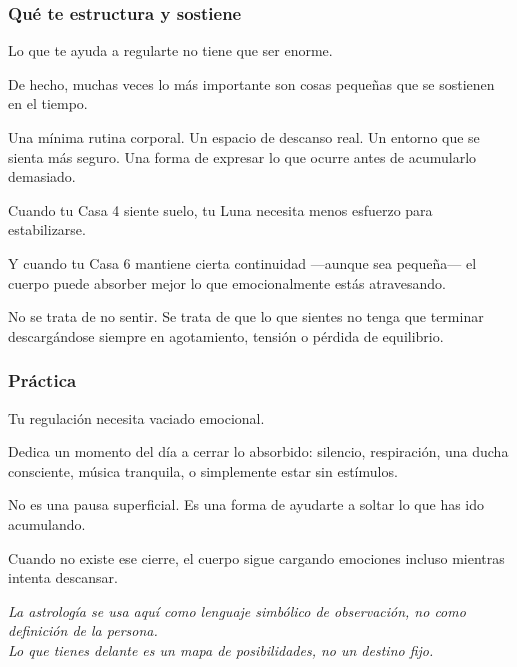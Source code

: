 \documentclass[11pt,a4paper]{article}
\begin{document}
\subsubsection*{Qué te estructura y sostiene}

Lo que te ayuda a regularte no tiene que ser enorme.

De hecho, muchas veces lo más importante son cosas pequeñas que se sostienen en el tiempo.

Una mínima rutina corporal.
Un espacio de descanso real.
Un entorno que se sienta más seguro.
Una forma de expresar lo que ocurre antes de acumularlo demasiado.

Cuando tu Casa 4 siente suelo, tu Luna necesita menos esfuerzo para estabilizarse.

Y cuando tu Casa 6 mantiene cierta continuidad —aunque sea pequeña— el cuerpo puede absorber mejor lo que emocionalmente estás atravesando.

No se trata de no sentir.
Se trata de que lo que sientes no tenga que terminar descargándose siempre en agotamiento, tensión o pérdida de equilibrio.

\subsubsection*{Práctica}

Tu regulación necesita vaciado emocional.

Dedica un momento del día a cerrar lo absorbido:
silencio,
respiración,
una ducha consciente,
música tranquila,
o simplemente estar sin estímulos.

No es una pausa superficial.
Es una forma de ayudarte a soltar lo que has ido acumulando.

Cuando no existe ese cierre, el cuerpo sigue cargando emociones incluso mientras intenta descansar.

\vspace{0.6cm}

\begin{center}
{\small\itshape\color{grisai}
La astrología se usa aquí como lenguaje simbólico de observación, no como definición de la persona.\\
Lo que tienes delante es un mapa de posibilidades, no un destino fijo.
}
\end{center}
\end{document}
